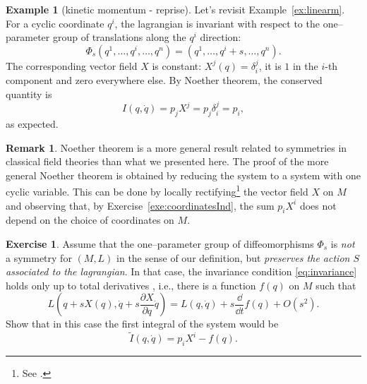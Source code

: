 \documentclass[english,fontsize=11pt,paper=b5]{scrbook}
\theoremstyle{definition}
\newtheorem{remark}{Remark}[chapter]
\newtheorem{example}{Example}[chapter]
\newtheorem{exercise}{Exercise}[chapter]
\begin{document}
    \begin{example}[kinetic momentum - reprise]\label{exa:kmom}
      Let's revisit Example~\ref{ex:linearm}.
      For a cyclic coordinate $q^i$, the lagrangian is invariant with respect to the one--parameter group of translations along the $q^i$ direction:
      \begin{equation}
        \Phi_s(q^1, \ldots, q^i, \ldots, q^n) = (q^1, \ldots, q^i + s, \ldots, q^n).
      \end{equation}
      The corresponding vector field $X$ is constant: $X^j(q) = \delta^j_i$, it is $1$ in the $i$-th component and zero everywhere else.
      By Noether theorem, the conserved quantity is
      \begin{equation}
        I(q,\dot q) = p_j X^j = p_j \delta^j_i = p_i,
      \end{equation}
      as expected.
    \end{example}

    \begin{remark}
      Noether theorem is a more general result related to symmetries in classical field theories than what we presented here.
      The proof of the more general Noether theorem is obtained by reducing the system to a system with one cyclic variable.
      This can be done by locally rectifying\footnote{See \cite[Chapter 3.5]{lectures:aom:seri}.} the vector field $X$ on $M$ and
      observing that, by Exercise~\ref{exe:coordinatesInd}, the sum $p_i X^i$ does not depend on the choice of coordinates on $M$.
    \end{remark}

    \begin{exercise}
      Assume that the one--parameter group of diffeomorphisms $\Phi_s$ is \emph{not} a symmetry for $(M,L)$ in the sense of our definition, but \emph{preserves the action $S$ associated to the lagrangian}.
      In that case, the invariance condition \eqref{eq:invariance} holds only up to total derivatives \cite[Chapter 4.20]{book:gelfand}, i.e., there is a function $f(q)$ on $M$ such that
      \begin{equation}
        L\left( q + s X(q), \dot q + s \frac{\partial X}{\partial q} \dot q\right)
        = L(q, \dot q) + s \frac{\dd}{\dd t}f(q) + O(s^2).
      \end{equation}
      Show that in this case the first integral of the system would be
      \begin{equation}
        \widetilde I(q, \dot q) = p_i X^i - f(q).
      \end{equation}
    \end{exercise}
\end{document}
